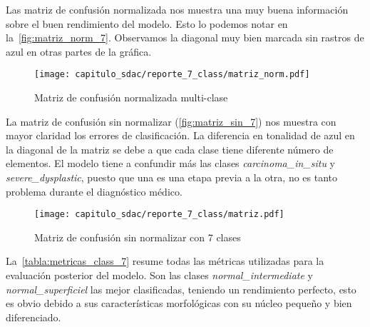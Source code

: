 Las matriz de confusión normalizada nos muestra una muy buena información sobre
el buen rendimiento del modelo. Esto lo podemos notar en
la~\autoref{fig:matriz_norm_7}. Observamos la diagonal muy bien marcada sin
rastros de azul en otras partes de la gráfica.

\begin{figure}[H]
    \centering
    \texttt{[image: capitulo\_sdac/reporte\_7\_class/matriz\_norm.pdf]}
    \caption{Matriz de confusión normalizada multi-clase} 
    \label{fig:matriz_norm_7}
\end{figure}

La matriz de confusión sin normalizar (\autoref{fig:matriz_sin_7}) nos muestra
con mayor claridad los errores de clasificación. La diferencia en tonalidad de
azul en la diagonal de la matriz se debe a que cada clase tiene diferente número
de elementos. El modelo tiene a confundir más las clases
\emph{carcinoma\_in\_situ} y \emph{severe\_dysplastic}, puesto que una es una
etapa previa a la otra, no es tanto problema durante el diagnóstico médico.

\begin{figure}[H]
    \centering
    \texttt{[image: capitulo\_sdac/reporte\_7\_class/matriz.pdf]}
    \caption{Matriz de confusión sin normalizar con 7 clases} 
    \label{fig:matriz_sin_7}
\end{figure}

La~\autoref{tabla:metricas_class_7} resume todas las métricas utilizadas para la
evaluación posterior del modelo. Son las clases \emph{normal\_intermediate} y
\emph{normal\_superficiel} las mejor clasificadas, teniendo un rendimiento
perfecto, esto es obvio debido a sus características morfológicas con su núcleo
pequeño y bien diferenciado. 


